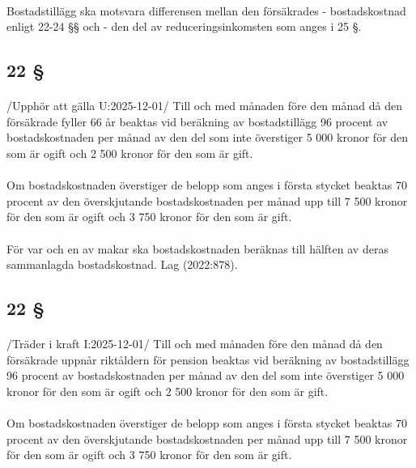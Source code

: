 \documentclass[a4paper,notitlepage,openany,10pt]{book}
\begin{document}
\paragraph*{}
Bostadstillägg ska motsvara differensen mellan den försäkrades
\newline - bostadskostnad enligt 22-24 §§ och
\newline - den del av reduceringsinkomsten som anges i 25 §.
\subsection*{22 §}
\paragraph*{}
/Upphör att gälla U:2025-12-01/
Till och med månaden före den månad då den försäkrade fyller 66 år beaktas vid beräkning av bostadstillägg 96 procent av bostadskostnaden per månad av den del som inte överstiger 5 000 kronor för den som är ogift och 2 500 kronor för den som är gift.
\paragraph*{}
Om bostadskostnaden överstiger de belopp som anges i första stycket beaktas 70 procent av den överskjutande bostadskostnaden per månad upp till 7 500 kronor för den som är ogift och 3 750 kronor för den som är gift.
\paragraph*{}
För var och en av makar ska bostadskostnaden beräknas till hälften av deras sammanlagda bostadskostnad.
Lag (2022:878).
\subsection*{22 §}
\paragraph*{}
/Träder i kraft I:2025-12-01/
Till och med månaden före den månad då den försäkrade uppnår riktåldern för pension beaktas vid beräkning av bostadstillägg 96 procent av bostadskostnaden per månad av den del som inte överstiger 5 000 kronor för den som är ogift och 2 500 kronor för den som är gift.
\paragraph*{}
Om bostadskostnaden överstiger de belopp som anges i första stycket beaktas 70 procent av den överskjutande bostadskostnaden per månad upp till 7 500 kronor för den som är ogift och 3 750 kronor för den som är gift.
\end{document}
